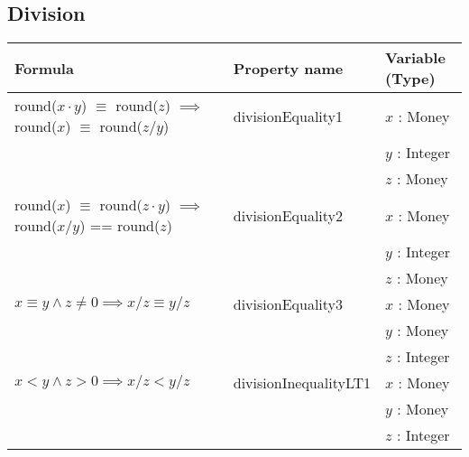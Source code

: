 \subsection*{Division}
\label{ssct:properties_division_updated}
\begin{table}[!ht]
\centering
\begin{tabular}{lll}
\hline
                        \textbf{Formula}                                        & \textbf{Property name} & \textbf{Variable (Type)} \\ \hline
\rowcolor[HTML]{EFEFEF} round($x \cdot y$) $\equiv$ round($z$) $\implies$
                                       round($x$) $\equiv$ round($z / y$)       & divisionEquality1      & $x$ : Money              \\
\rowcolor[HTML]{EFEFEF}                                                         &                        & $y$ : Integer            \\
\rowcolor[HTML]{EFEFEF}                                                         &                        & $z$ : Money              \\
                        round($x$) $\equiv$ round($z \cdot y$) $\implies$
												                     round($x / y$) == round($z$)       & divisionEquality2      & $x$ : Money              \\
                                                                                &                        & $y$ : Integer            \\
                                                                                &                        & $z$ : Money              \\
\rowcolor[HTML]{EFEFEF} $x \equiv y \land z \neq 0 \implies x / z \equiv y / z$ & divisionEquality3      & $x$ : Money              \\
\rowcolor[HTML]{EFEFEF}                                                         &                        & $y$ : Money              \\
\rowcolor[HTML]{EFEFEF}                                                         &                        & $z$ : Integer            \\
												$x < y \land z > 0 \implies x / z < y / z$              & divisionInequalityLT1  & $x$ : Money              \\
																																			          &                        & $y$ : Money              \\
																																			          &                        & $z$ : Integer            \\

\end{tabular}
\end{table}
